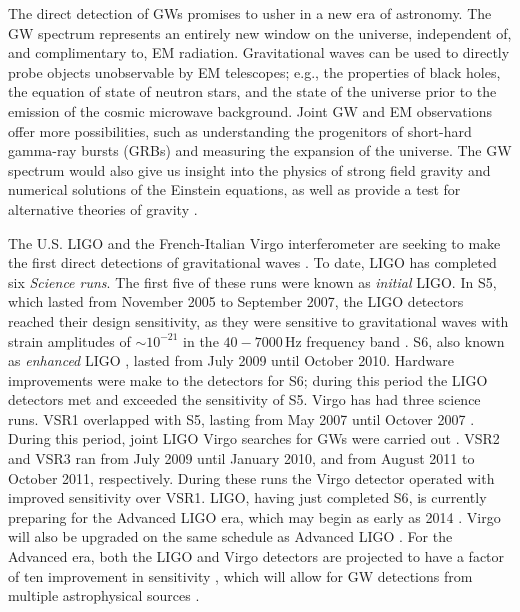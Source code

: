 The direct detection of \acp{GW} promises to usher in a new era of astronomy.
The \ac{GW} spectrum represents an entirely new window on the universe,
independent of, and complimentary to, \ac{EM} radiation. Gravitational waves
can be used to directly probe objects unobservable by EM telescopes; e.g., the
properties of black holes, the equation of state of neutron stars, and the
state of the universe prior to the emission of the cosmic microwave background.
Joint GW and EM observations offer more possibilities, such as understanding
the progenitors of short-hard gamma-ray bursts (GRBs) and measuring the
expansion of the universe. The GW spectrum would also give us insight into the
physics of strong field gravity and numerical solutions of the Einstein
equations, as well as provide a test for alternative theories of gravity
\cite{SathyaSchutz:livingReveiw:2009}.

The U.S. \ac{LIGO} and the French-Italian Virgo interferometer are seeking to
make the first direct detections of gravitational waves \cite{Abbott:2007kv}.
To date, \ac{LIGO} has completed six \emph{Science runs}. The first five of
these runs were known as \emph{initial} \ac{LIGO}. In \ac{S5}, which lasted
from November 2005 to September 2007, the \ac{LIGO} detectors reached their
design sensitivity, as they were sensitive to gravitational waves with strain
amplitudes of $\sim10^{-21}$ in the $40-7000\,$Hz frequency band
\cite{Abbott:2007kv}. \ac{S6}, also known as \emph{enhanced} \ac{LIGO}
\cite{Adhikari:2006}, lasted from July 2009 until October 2010. Hardware
improvements were make to the detectors for \ac{S6}; during this period the
\ac{LIGO} detectors met and exceeded the sensitivity of \ac{S5}. Virgo has had
three science runs. \ac{VSR1} overlapped with \ac{S5}, lasting from May 2007
until Octover 2007 \cite{Acernese:2008zzf}. During this period, joint \ac{LIGO}
Virgo searches for \acp{GW} were carried out \cite{S5VSR1Burst, S5LowMassLV,
Collaboration:2009kk}. \ac{VSR2} and \ac{VSR3} ran from July 2009 until January
2010, and from August 2011 to October 2011, respectively. During these runs the
Virgo detector operated with improved sensitivity over \ac{VSR1}. \ac{LIGO},
having just completed \ac{S6}, is currently preparing for the Advanced
\ac{LIGO} era, which may begin as early as 2014 \cite{Harry:2010zz}. Virgo will
also be upgraded on the same schedule as Advanced \ac{LIGO}
\cite{Acernese:2008zzf}. For the Advanced era, both the \ac{LIGO} and Virgo
detectors are projected to have a factor of ten improvement in sensitivity
\cite{Harry:2010zz, PSD:AV}, which will allow for \ac{GW} detections from
multiple astrophysical sources \cite{Harry:2010zz, ratesdoc}.

